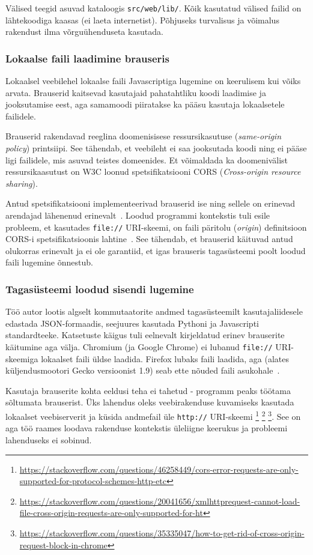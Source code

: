 \documentclass[12pt]{article}
\begin{document}
Välised teegid asuvad kataloogis \texttt{src/web/lib/}.
Kõik kasutatud välised failid on lähtekoodiga kaasas (ei laeta internetist).
Põhjuseks turvalisus ja võimalus rakendust ilma võrguühenduseta kasutada.

\subsubsection{Lokaalse faili laadimine brauseris}
Lokaalsel veebilehel lokaalse faili Javascriptiga lugemine on keerulisem kui võiks arvata.
Brauserid kaitsevad kasutajaid pahatahtliku koodi laadimise ja jooksutamise eest, aga samamoodi
piiratakse ka pääsu kasutaja lokaalsetele failidele.

Brauserid rakendavad reeglina doomenisisese ressursikasutuse (\textit{same-origin policy})
printsiipi.
See tähendab, et veebileht ei saa jooksutada koodi ning ei pääse ligi failidele, mis asuvad
teistes domeenides.
Et võimaldada ka doomenivälist ressursikaasutust on W3C loonud spetsifikatsiooni CORS
(\textit{Cross-origin resource sharing}).
~\cite{w3CORS}

Antud spetsifikatsiooni implementeerivad brauserid ise ning sellele on erinevad arendajad
lähenenud erinevalt~\cite{localWebSec}.
Loodud programmi kontekstis tuli esile probleem, et kasutades \texttt{file://} URI-skeemi, on faili
päritolu (\textit{origin}) definitsioon CORS-i spetsifikatsioonis
lahtine~\cite[peatükk 4, punkt 4]{ietfOrigin}.
See tähendab, et brauserid käituvad antud olukorras erinevalt ja ei ole garantiid, et igas
brauseris tagasüsteemi poolt loodud faili lugemine õnnestub.

\subsubsection{Tagasüsteemi loodud sisendi lugemine} \label{dataInput}
Töö autor lootis algselt kommutaatorite andmed tagasüsteemilt kasutajaliidesele edastada
JSON-formaadis, seejuures kasutada Pythoni ja Javascripti standardteeke.
Katsetuste käigus tuli eelnevalt kirjeldatud erinev brauserite käitumine aga välja.
Chromium (ja Google Chrome) ei lubanud \texttt{file://} URI-skeemiga lokaalset faili üldse laadida.
Firefox lubaks faili laadida, aga (alates küljendusmootori Gecko versioonist 1.9) seab ette nõuded
faili asukohale~\cite{ffCORS}.

Kasutaja brauserite kohta eeldusi teha ei tahetud - programm peaks töötama sõltumata brauserist.
Üks lahendus oleks veebirakenduse kuvamiseks kasutada lokaalset veebiserverit ja küsida andmefail
üle \texttt{http://} URI-skeemi
\footnote{\url{https://stackoverflow.com/questions/46258449/cors-error-requests-are-only-supported-for-protocol-schemes-http-etc}}
\footnote{\url{https://stackoverflow.com/questions/20041656/xmlhttprequest-cannot-load-file-cross-origin-requests-are-only-supported-for-ht}}
\footnote{\url{https://stackoverflow.com/questions/35335047/how-to-get-rid-of-cross-origin-request-block-in-chrome}}.
See on aga töö raames loodava rakenduse kontekstis üleliigne keerukus ja probleemi lahenduseks ei
sobinud.
\end{document}
